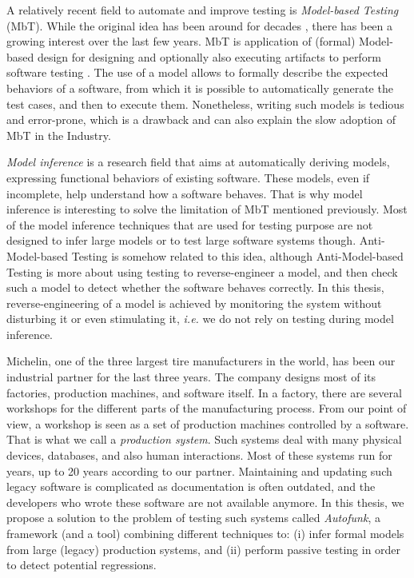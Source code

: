 A relatively recent field to automate and improve testing is
\emph{Model-based Testing} (MbT). While the original idea has
been around for decades \cite{moore56}, there has been a growing
interest over the last few years.  MbT is application of (formal)
Model-based design for designing and optionally also executing
artifacts to perform software testing
\cite{Jorgensen:1995:STC:526521}. The use of a model allows to
formally describe the expected behaviors of a software, from
which it is possible to automatically generate the test cases,
and then to execute them.  Nonetheless, writing such models is
tedious and error-prone, which is a drawback and can also explain
the slow adoption of MbT in the Industry.

\emph{Model inference} is a research field that aims at
automatically deriving models, expressing functional behaviors of
existing software. These models, even if incomplete, help
understand how a software behaves. That is why model inference is
interesting to solve the limitation of MbT mentioned previously.
Most of the model inference techniques that are used for testing
purpose are not designed to infer large models or to test large
software systems though. Anti-Model-based Testing \cite{antimbt} is
somehow related to this idea, although Anti-Model-based Testing
is more about using testing to reverse-engineer a model, and then
check such a model to detect whether the software behaves
correctly. In this thesis, reverse-engineering of a model is
achieved by monitoring the system without disturbing it or even
stimulating it, \emph{i.e.} we do not rely on testing during model
inference.

Michelin, one of the three largest tire manufacturers in the
world, has been our industrial partner for the last three years.
The company designs most of its factories, production machines,
and software itself. In a factory, there are several workshops
for the different parts of the manufacturing process. From our
point of view, a workshop is seen as a set of production machines
controlled by a software. That is what we call a \emph{production
system}. Such systems deal with many physical devices, databases,
and also human interactions. Most of these systems run for years,
up to 20 years according to our partner. Maintaining and updating
such legacy software is complicated as documentation is often
outdated, and the developers who wrote these software are not
available anymore.  In this thesis, we propose a solution to the
problem of testing such systems called \textit{Autofunk}, a
framework (and a tool) combining different techniques to: (i)
infer formal models from large (legacy) production systems, and
(ii) perform passive testing in order to detect potential
regressions.

